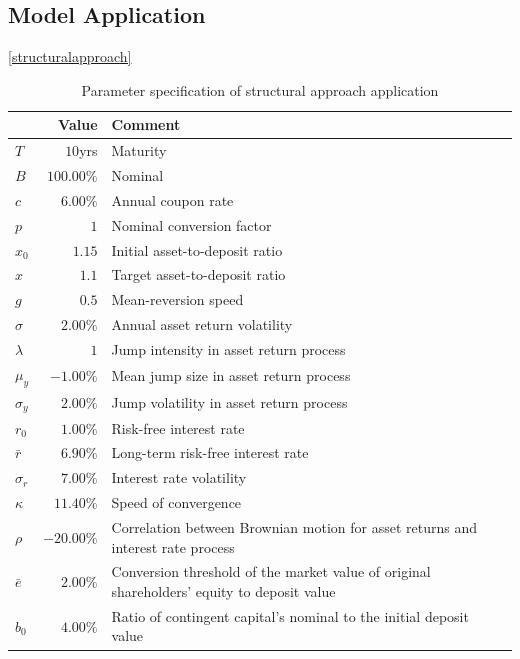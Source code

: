 \subsection{Model Application}

\ref{structuralapproach}

\begin{table}[H]
	\setlength{\extrarowheight}{2.5pt}
	\centering
	\begin{tabular}{lrp{10cm}}
		\toprule
			 & Value & Comment \\
		\midrule
			$T$ & $10$yrs & Maturity \\
			$B$ & $100.00\%$ & Nominal \\
			$c$ & $6.00\%$ & Annual coupon rate \\
			$p$ & $1$ & Nominal conversion factor\\
			$x_0$ & $1.15$ & Initial asset-to-deposit ratio\\
			$\hat{x}$ & $1.1$ & Target asset-to-deposit ratio\\
			$g$ & $0.5$ & Mean-reversion speed \\
			$\sigma$ & $2.00\%$ & Annual asset return volatility \\
			$\lambda$ & $1$& Jump intensity in asset return process\\			
			$\mu_y$ &$-1.00\%$ & Mean jump size in asset return process\\
			$\sigma_y$ &$2.00\%$ & Jump volatility in asset return process\\		
			$r_0$ & $1.00 \%$ & Risk-free interest rate\\
			$\bar{r}$ & $ 6.90\%$ & Long-term risk-free interest rate\\
			$\sigma_r$ & $7.00\%$ & Interest rate volatility \\
			$\kappa$ & $11.40\%$ & Speed of convergence \\
			$\rho$ & $-20.00\%$ & Correlation between Brownian motion for asset returns and interest rate process\\
			$\bar{e}$ & $2.00\%$ & Conversion threshold of the market value of original shareholders' equity to deposit value\\
			$b_0$ & $4.00\%$ & Ratio of contingent capital's nominal to the initial deposit value\\
		\bottomrule
	\end{tabular}
	\caption[Parameter specification of structural approach application]{Parameter specification of structural approach application \citep{alvemar2012modelling, pennacchi2010structural}}
\end{table}


